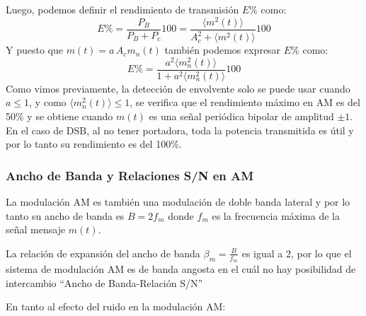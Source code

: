 \documentclass[11pt,a4paper]{article}
\numberwithin{equation}{section}
\begin{document}
Luego, podemos definir el rendimiento de transmisión $E\%$ como:
\begin{equation}\label{eq:E_AM}
  E\%=\frac{P_B}{P_B+P_c}100=\frac{\langle m^2(t)\rangle }{A_c^2+\langle m^2(t)\rangle }100
\end{equation}
Y puesto que $m(t)=a\,A_cm_n(t)$ también podemos expresar $E\%$ como:
\begin{equation}
  E\%=\frac{a^2\langle m_n^2(t)\rangle }{1+a^2\langle m_n^2(t)\rangle }100
\end{equation}
Como vimos previamente, la detección de envolvente solo se puede usar cuando $a\leq1$, y como $\langle m_n^2(t)\rangle \leq1$, se verifica que el rendimiento máximo en AM es del 50\% y se obtiene cuando $m(t)$ es una señal periódica bipolar de amplitud $\pm1$. En el caso de DSB, al no tener portadora, toda la potencia transmitida es útil y por lo tanto su rendimiento es del 100\%.
\subsubsection{Ancho de Banda y Relaciones S/N en AM}
La modulación AM es también una modulación de doble banda lateral y por lo tanto su ancho de banda es $B=2f_m$ donde $f_m$ es la frecuencia máxima de la señal mensaje $m(t)$.

La relación de expansión del ancho de banda $\beta_m=\frac{B}{f_m}$ es igual a 2, por lo que el sistema de modulación AM es de banda angosta en el cuál no hay posibilidad de intercambio “Ancho de Banda-Relación S/N”

En tanto al efecto del ruido en la modulación AM:
\end{document}
